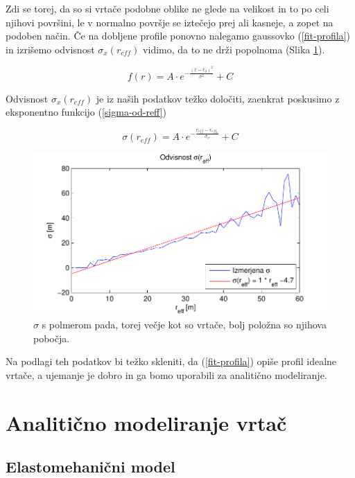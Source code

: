 \documentclass[a4paper, oneside, 12pt]{book}
\begin{document}
Zdi se torej, da so si vrtače podobne oblike ne glede na velikost in to po celi njihovi površini, le v normalno površje se iztečejo prej ali kasneje, a zopet na podoben način.
Če na dobljene profile ponovno nalegamo gaussovko (\ref{fit-profila}) in izrišemo odvisnost $\sigma_x (r_{eff})$ vidimo, da to ne drži popolnoma  (Slika \ref{fig:menisija-sigma}).  

\begin{equation}
  f(r) = A \cdot e^{-\frac{(r-r_0)^2}{\sigma^2}} + C  
  \label{fit-profila}
\end{equation}

Odvisnost $\sigma_x(r_{eff})$ je iz naših podatkov težko določiti, zaenkrat poskusimo z eksponentno funkcijo (\ref{sigma-od-reff})

\begin{equation}
  \sigma (r_{eff}) = A \cdot e^{-\frac{r_{eff}-r_{eff_0}}{\sigma_{\sigma}}} + C 
  \label{sigma-od-reff}
\end{equation}

\begin{figure}[H]
  \centering
  \includegraphics{slike/menisija-sigme}
  \caption{$\sigma$ s polmerom pada, torej večje kot so vrtače, bolj položna so njihova pobočja.}
  \label{fig:menisija-sigma}
\end{figure}

Na podlagi teh podatkov bi težko skleniti, da (\ref{fit-profila}) opiše profil idealne vrtače, a ujemanje je dobro in ga bomo uporabili za analitično modeliranje. 


\chapter{Analitično modeliranje vrtač}
\label{ch2}

\section{Elastomehanični model}
\end{document}
